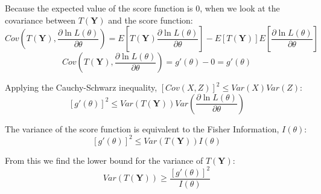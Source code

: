 \documentclass[12pt,letterpaper]{article}
\begin{document}
\begin{enumerate}[leftmargin=*]
Because the expected value of the score function is 0,  when we look at the covariance between $T(\textbf{Y})$ and the score function:
\[ Cov\left( T(\textbf{Y}), \frac{\partial \ln L(\theta)}{\partial \theta} \right) = E\left[ T(\textbf{Y}) \frac{\partial \ln L(\theta)}{\partial \theta} \right] - E[T(\textbf{Y})]E\left[ \frac{\partial \ln L(\theta)}{\partial \theta} \right] \]
\[ Cov\left( T(\textbf{Y}), \frac{\partial \ln L(\theta)}{\partial \theta} \right) = g'(\theta) - 0 = g'(\theta) \]

Applying the Cauchy-Schwarz inequality, $[Cov(X,Z)]^2 \le Var(X)Var(Z)$:
\[ \left[ g'(\theta) \right]^2 \le Var(T(\textbf{Y})) Var\left( \frac{\partial \ln L(\theta)}{\partial \theta} \right) \]

The variance of the score function is equivalent to the Fisher Information, $I(\theta)$:
\[ \left[ g'(\theta) \right]^2 \le Var(T(\textbf{Y})) I(\theta) \]

From this we find the lower bound for the variance of $T(\textbf{Y})$:
\[ Var(T(\textbf{Y})) \ge \frac{\left[ g'(\theta) \right]^2}{I(\theta)} \]

\end{enumerate} 
\end{document}
